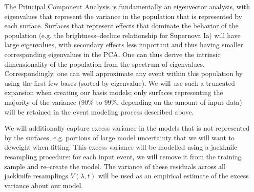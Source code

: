  The Principal Component
Analysis is fundamentally an eigenvector analysis, with eigenvalues that
represent the variance in the population that is represented by each surface.
Surfaces that represent effects that dominate the behavior of the population
(e.g. the brightness--decline relationship for Supernova Ia) will have large
eigenvalues, with secondary effects less important and thus having smaller
corresponding eigenvalues in the PCA.  One can thus derive the intrinsic
dimensionality of the population from the spectrum of eigenvalues.
Correspondingly, one can well approximate any event within this population by
using the first few bases (sorted by eigenvalue).  We will use such a truncated
expansion when creating our basis models; only surfaces representing the
majority of the variance ($90\%$ to $99\%$, depending on the amount of input
data) will be retained in the event modeling process described above.

 We will additionally capture
excess variance in the models that is not represented by the surfaces, e.g.
portions of large model uncertainty that we will want to deweight when fitting.
This excess variance will be modelled using a jackknife resampling procedure:
for each input event, we will remove it from the training sample and re--create
the model.  The variance of these residuals across all jackknife resamplings
$V(\lambda, t)$ will be used as an empirical estimate of the excess variance
about our model.  

